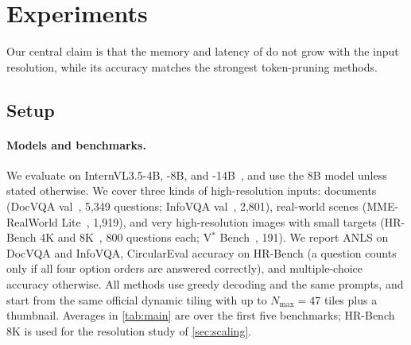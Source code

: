\section{Experiments}
\label{sec:exp}

Our central claim is that the memory and latency of \method do not grow with the input resolution,
while its accuracy matches the strongest token-pruning methods.



\subsection{Setup}
\label{sec:setup}

\paragraph{Models and benchmarks.}
We evaluate on InternVL3.5-4B, -8B, and -14B~\cite{internvl35}, and use the 8B model unless stated
otherwise. We cover three kinds of high-resolution inputs: documents (DocVQA val~\cite{docvqa}, 5,349
questions; InfoVQA val~\cite{infovqa}, 2,801), real-world scenes (MME-RealWorld Lite~\cite{mmerealworld},
1,919), and very high-resolution images with small targets (HR-Bench 4K and 8K~\cite{hrbench}, 800
questions each; V$^*$ Bench~\cite{vstar}, 191). We report ANLS on DocVQA and InfoVQA, CircularEval
accuracy on HR-Bench (a question counts only if all four option orders are answered correctly), and
multiple-choice accuracy otherwise. All methods use greedy decoding and the same prompts, and start
from the same official dynamic tiling with up to $N_{\max}=47$ tiles plus a thumbnail. Averages in
\cref{tab:main} are over the first five benchmarks; HR-Bench 8K is used for the resolution study of
\cref{sec:scaling}.

